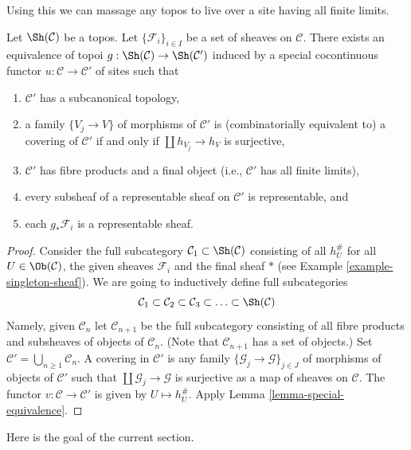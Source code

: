 \noindent
Using this we can massage any topos to live over a site having
all finite limits.

\begin{lemma}
\label{lemma-topos-good-site}
Let $\Sh(\mathcal{C})$ be a topos. Let $\{\mathcal{F}_i\}_{i \in I}$
be a set of sheaves on $\mathcal{C}$. There exists an equivalence of topoi
$g : \Sh(\mathcal{C}) \to \Sh(\mathcal{C}')$ induced by a special
cocontinuous functor $u : \mathcal{C} \to \mathcal{C}'$ of sites
such that
\begin{enumerate}
\item $\mathcal{C}'$ has a subcanonical topology,
\item a family $\{V_j \to V\}$ of morphisms of $\mathcal{C}'$
is (combinatorially equivalent to) a covering of $\mathcal{C}'$
if and only if $\coprod h_{V_j} \to h_V$ is surjective,
\item $\mathcal{C}'$ has fibre products and a final object
(i.e., $\mathcal{C}'$ has all finite limits),
\item every subsheaf of a representable sheaf on $\mathcal{C}'$
is representable, and
\item each $g_*\mathcal{F}_i$ is a representable sheaf.
\end{enumerate}
\end{lemma}

\begin{proof}
Consider the full subcategory
$\mathcal{C}_1 \subset \Sh(\mathcal{C})$ consisting of all
$h_U^\#$ for all $U \in \Ob(\mathcal{C})$, the given sheaves
$\mathcal{F}_i$ and the final sheaf $*$ (see
Example \ref{example-singleton-sheaf}). We are going to inductively
define full subcategories
$$
\mathcal{C}_1 \subset \mathcal{C}_2 \subset \mathcal{C}_3 \subset \ldots
\subset \Sh(\mathcal{C})
$$
Namely, given $\mathcal{C}_n$ let $\mathcal{C}_{n + 1}$ be the full
subcategory consisting of all fibre products and subsheaves of objects
of $\mathcal{C}_n$. (Note that $\mathcal{C}_{n + 1}$ has a set
of objects.) Set
$\mathcal{C}' = \bigcup_{n \geq 1} \mathcal{C}_n$.
A covering in $\mathcal{C}'$ is any family
$\{\mathcal{G}_j \to \mathcal{G}\}_{j \in J}$ of morphisms of objects
of $\mathcal{C}'$ such that
$\coprod \mathcal{G}_j \to \mathcal{G}$ is surjective
as a map of sheaves on $\mathcal{C}$.
The functor $v : \mathcal{C} \to \mathcal{C'}$ is given by
$U \mapsto h_U^\#$. Apply
Lemma \ref{lemma-special-equivalence}.
\end{proof}

\noindent
Here is the goal of the current section.

